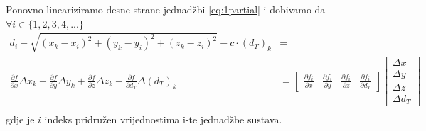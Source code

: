 \documentclass[a4paper,twoside,12pt]{memoir} %
\begin{document}
Ponovno lineariziramo desne strane jednadžbi \ref{eq:1partial} i dobivamo da $\forall i \in \{1,2,3,4, ...\}$
\begin{align*}
d_i - \sqrt{(x_k-x_i)^{2}+(y_k-y_i)^{2}+(z_k-z_i)^{2}} - c\cdot (d_T)_k & = \\
\frac{\partial f}{\partial x}\Delta x_k + \frac{\partial f}{\partial y}\Delta y_k + \frac{\partial f}{\partial z}\Delta z_k + \frac{\partial f}{\partial d_T}\Delta (d_T)_k &= 
\begin{bmatrix}
\frac{\partial f_i}{\partial x} &
\frac{\partial f_i}{\partial y} &
\frac{\partial f_i}{\partial z} &
\frac{\partial f_i}{\partial d_T}
\end{bmatrix}
\begin{bmatrix}
\Delta x \\
\Delta y \\
\Delta z \\
\Delta d_T
\end{bmatrix} \\ 
\end{align*}
gdje je $i$ indeks pridružen vrijednostima i-te jednadžbe sustava.
\end{document}
